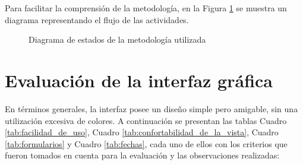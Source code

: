 \documentclass[10pt,times,twocolumn]{article}
\begin{document}
Para facilitar la comprensión de la metodología, en la Figura \ref{fig:diagrama-flujo} se muestra un diagrama representando el flujo de las actividades.

\begin{figure}[H]
    \centering
    \caption{Diagrama de estados de la metodología utilizada}
    \label{fig:diagrama-flujo}
\end{figure}

\section{Evaluación de la interfaz gráfica}

En términos generales, la interfaz posee un diseño simple pero amigable, sin una utilización excesiva de colores. A continuación se presentan las tablas Cuadro \ref{tab:facilidad_de_uso}, Cuadro \ref{tab:confortabilidad_de_la_vista}, Cuadro \ref{tab:formularios} y Cuadro \ref{tab:fechas}, cada uno de ellos con los criterios que fueron tomados en cuenta para la evaluación y las observaciones realizadas:
\end{document}
